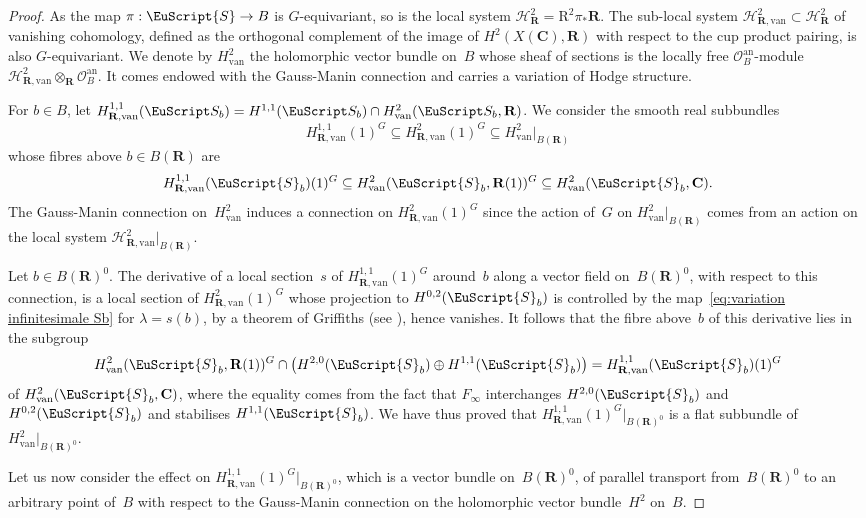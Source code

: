 \documentclass[JEP,XML,SOM,Unicode]{cedram}
\let\mathcal\EuScript
\theoremstyle{plain}
\theoremstyle{definition}
\numberwithin{equation}{section}
\newcommand{\sH}{{\mathscr H}}
\newcommand{\sO}{{\mathscr O}}
\renewcommand{\C}{{\mathbf C}}
\newcommand{\R}{{\mathbf R}}
\newcommand{\van}{\mathrm{van}}
\newcommand{\RR}{{\mathrm{R}}}
\begin{document}
\begin{proof}
As the map $\pi:\mathcal{S}\to B$ is $G$\nobreakdash-equivariant,
so is the local system $\sH^2_{\R}=\RR^2\pi_*\R$.
The sub-local system $\sH^2_{\R,\van}\subset \sH^2_\R$ of vanishing cohomology,
defined as the orthogonal complement of the image of $H^2(X(\C),\R)$
with respect to the cup product pairing, is also $G$\nobreakdash-equivariant.
We denote by
$H^2_{\van}$
the holomorphic vector bundle on~$B$ whose sheaf of sections is the locally
free $\sO_B^{\mathrm{an}}$\nobreakdash-module $\sH^2_{\R,\van} \otimes_\R \sO_B^{\mathrm{an}}$.
It comes endowed with the Gauss-Manin connection and carries a variation of Hodge structure.

For $b \in B$, let
$H^{1,1}_{\R,\van}(\mathcal S_b)=H^{1,1}(\mathcal S_b) \cap H^2_\van(\mathcal S_b,\R)$.
We consider the smooth real subbundles
\[
H^{1,1}_{\R,\van}(1)^G\subseteq H^2_{\R,\van}(1)^G\subseteq H^2_{\van}|_{B(\R)}
\]
whose fibres above $b \in B(\R)$ are
\[
H_{\R,\van}^{1,1}(\mathcal{S}_{b})(1)^G\subseteq H^2_{\van}(\mathcal{S}_{b},\R(1))^G\subseteq H^2_{\van}(\mathcal{S}_b,\C).
\]
The Gauss-Manin connection on~$H^2_\van$
induces a connection on $H^2_{\R,\van}(1)^G$
since the action of~$G$ on $H^2_{\van}|_{B(\R)}$ comes from an action on the local system $\sH^2_{\R,\van}|_{B(\R)}$.

Let $b\in B(\R)^0$.
The derivative of a local section~$s$ of $H^{1,1}_{\R,\van}(1)^G$ around~$b$
along a vector field on~$B(\R)^0$, with respect to this connection,
is a local section of $H^2_{\R,\van}(1)^G$
whose projection to $H^{0,2}(\mathcal{S}_b)$ is controlled by the
map~\eqref{eq:variation infinitesimale Sb} for $\lambda=s(b)$, by a theorem of Griffiths
(see \cite[Th.\,17.7]{voisinbook}), hence vanishes. It follows
that the fibre above~$b$ of this derivative lies in the subgroup
\[
H^2_{\van}(\mathcal{S}_{b},\R(1))^G\cap\big(H^{2,0}(\mathcal{S}_b)\oplus H^{1,1}(\mathcal{S}_b)\big)=H_{\R,\van}^{1,1}(\mathcal{S}_{b})(1)^G
\]
of $H^2_{\van}(\mathcal{S}_b,\C)$,
where the equality comes from the fact that $F_\infty$
interchanges $H^{2,0}(\mathcal{S}_b)$ and $H^{0,2}(\mathcal{S}_b)$
and stabilises $H^{1,1}(\mathcal{S}_b)$.
We have thus proved that
$H^{1,1}_{\R,\van}(1)^G|_{B(\R)^0}$
is a flat subbundle of $H^2_{\van}|_{B(\R)^0}$.

Let us now consider the effect on
$H^{1,1}_{\R,\van}(1)^G|_{B(\R)^0}$,
which is a vector bundle on~$B(\R)^0$,
of parallel transport
from~$B(\R)^0$ to an arbitrary point of~$B$
with respect to the Gauss-Manin connection on the holomorphic vector bundle~$H^2$ on~$B$.


\end{proof}
\end{document}

